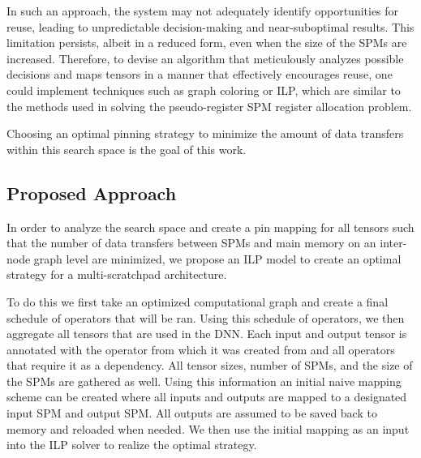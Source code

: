 In such an approach, the system may not adequately identify opportunities for
reuse, leading to unpredictable decision-making and near-suboptimal results.
This limitation persists, albeit in a reduced form, even when the size of the
SPMs are increased. Therefore, to devise an algorithm that meticulously analyzes
possible decisions and maps tensors in a manner that effectively encourages
reuse, one could implement techniques such as graph coloring or ILP, which are
similar to the methods used in solving the pseudo-register SPM register
allocation problem.

Choosing an optimal pinning strategy to minimize the amount of data transfers
within this search space is the goal of this work.

\subsection{Proposed Approach}
In order to analyze the search space and create a pin mapping for all tensors
such that the number of data transfers between SPMs and main memory on an
inter-node graph level are minimized, we propose an ILP model to create an
optimal strategy for a multi-scratchpad architecture.

To do this we first take an optimized computational graph and create a final
schedule of operators that will be ran. Using this schedule of operators, we
then aggregate all tensors that are used in the DNN. Each input and output
tensor is annotated with the operator from which it was created from and all
operators that require it as a dependency. All tensor sizes, number of SPMs,
and the size of the SPMs are gathered as well. Using this information an
initial naive mapping scheme can be created where all inputs and outputs are
mapped to a designated input SPM and output SPM. All outputs are assumed to be
saved back to memory and reloaded when needed. We then use the initial mapping
as an input into the ILP solver to realize the optimal strategy.
